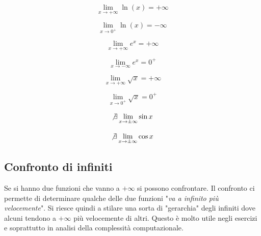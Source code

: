 \begin{multicols}{2}
    \begin{equation*}
        \lim _{x \to +\infty} \ln(x) = +\infty
    \end{equation*}
    
    \begin{equation*}
        \lim _{x \to 0^+} \ln(x) = -\infty
    \end{equation*}
    
    \begin{equation*}
        \lim _{x \to +\infty} e^x = +\infty
    \end{equation*}

    \begin{equation*}
        \lim _{x \to -\infty} e^x = 0^+
    \end{equation*}

    \begin{equation*}
        \lim _{x \to +\infty} \sqrt{x} = +\infty
    \end{equation*}

    \begin{equation*}
        \lim _{x \to 0^+} \sqrt{x} = 0^+
    \end{equation*}

    \begin{equation*}
        \not \exists \lim _{x \to \pm \infty} \sin{x}
    \end{equation*}
    
    \begin{equation*}
        \not \exists \lim _{x \to \pm \infty} \cos{x}
    \end{equation*}
\end{multicols}


\subsection{Confronto di infiniti} \label{sec:GerarchiaInfiniti}

Se si hanno due funzioni che vanno a $+\infty$ si possono confrontare. Il confronto ci permette di determinare qualche delle due funzioni "\textit{va a infinito più velocemente}". Si riesce quindi a stilare una sorta di "gerarchia" degli infiniti dove alcuni tendono a $+\infty$ più velocemente di altri. Questo è molto utile negli esercizi e soprattutto in analisi della complessità computazionale.\\

